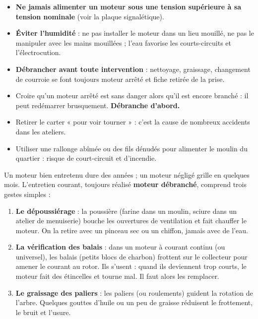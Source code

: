 \documentclass[11pt]{article}
\newcounter{popsec}
\newcounter{popsub}
\newcommand{\courssub}[1]{%
  \stepcounter{popsub}%
  \par\vspace{9pt}\noindent{\popxbold\fontsize{11.5}{13}\selectfont\color{popink}{\color{poporange}\thepopsec.\thepopsub}\hspace{6pt}#1}\par\nopagebreak\vspace{4pt}
}
\begin{document}
\begin{aretenir}
\begin{itemize}
\item \textbf{Ne jamais alimenter un moteur sous une tension supérieure à sa tension nominale} (voir la plaque signalétique).
\item \textbf{Éviter l'humidité} : ne pas installer le moteur dans un lieu mouillé, ne pas le manipuler avec les mains mouillées ; l'eau favorise les courts-circuits et l'électrocution.
\item \textbf{Débrancher avant toute intervention} : nettoyage, graissage, changement de courroie se font toujours moteur arrêté et fiche retirée de la prise.
\end{itemize}
\end{aretenir}

\begin{attention}
\begin{itemize}
\item Croire qu'un moteur arrêté est sans danger alors qu'il est encore branché : il peut redémarrer brusquement. \textbf{Débranche d'abord.}
\item Retirer le carter « pour voir tourner » : c'est la cause de nombreux accidents dans les ateliers.
\item Utiliser une rallonge abîmée ou des fils dénudés pour alimenter le moulin du quartier : risque de court-circuit et d'incendie.
\end{itemize}
\end{attention}

\courssub{Entretien simple d'un moteur}

Un moteur bien entretenu dure des années ; un moteur négligé grille en quelques mois. L'entretien courant, toujours réalisé \textbf{moteur débranché}, comprend trois gestes simples :

\begin{enumerate}
\item \textbf{Le dépoussiérage} : la poussière (farine dans un moulin, sciure dans un atelier de menuiserie) bouche les ouvertures de ventilation et fait chauffer le moteur. On la retire avec un pinceau sec ou un chiffon, jamais avec de l'eau.
\item \textbf{La vérification des balais} : dans un moteur à courant continu (ou universel), les balais (petits blocs de charbon) frottent sur le collecteur pour amener le courant au rotor. Ils s'usent : quand ils deviennent trop courts, le moteur fait des étincelles et tourne mal. Il faut alors les remplacer.
\item \textbf{Le graissage des paliers} : les paliers (ou roulements) guident la rotation de l'arbre. Quelques gouttes d'huile ou un peu de graisse réduisent le frottement, le bruit et l'usure.
\end{enumerate}
\end{document}
